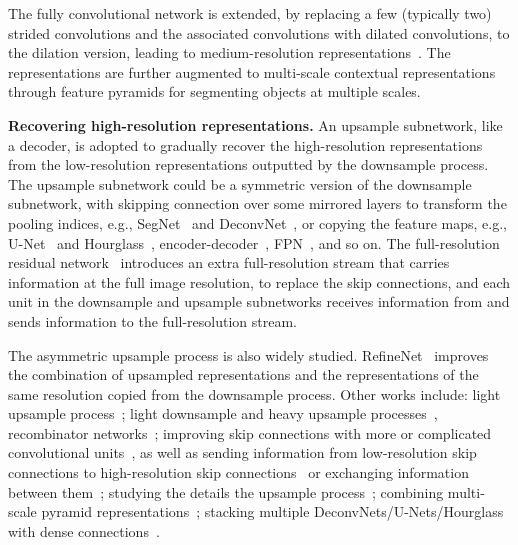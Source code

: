 \documentclass[10pt,twocolumn,letterpaper]{article}
\begin{document}
The fully convolutional network
is extended,
by replacing a few (typically two) strided convolutions
and the associated convolutions with dilated convolutions,
to the dilation version,
leading to medium-resolution representations~\cite{ZhaoSQWJ17,ChenPKMY18, YuKF17,ChenPKMY14, LiPYZDS18}.
The representations are further augmented
to multi-scale contextual representations~\cite{ZhaoSQWJ17,ChenPKMY18,ChenYWXY16} through feature pyramids
for segmenting objects at multiple scales.

\vspace{.1cm}
\noindent\textbf{Recovering high-resolution representations.}
An upsample subnetwork,
like a decoder,
is adopted
to gradually recover the high-resolution representations
from the low-resolution representations outputted by the downsample process.
The upsample subnetwork could be a symmetric version
of the downsample subnetwork,
with skipping connection over some mirrored layers
to transform the pooling indices,
e.g., SegNet~\cite{BadrinarayananK17} and DeconvNet~\cite{NohHH15},
or copying the feature maps, e.g., U-Net~\cite{RonebergerFB15} and Hourglass~\cite{NewellYD16, YangLZ17, BulatT17, DengTZZ17, BulatT17a},
encoder-decoder~\cite{PengFWM16},
FPN~\cite{LinDGHHB17}, and so on.
The full-resolution residual network~\cite{PohlenHML17}
introduces an extra full-resolution stream
that carries information at the full image resolution,
to replace the skip connections,
and each unit in the downsample and upsample subnetworks
receives information from and sends information to
the full-resolution stream.

The asymmetric upsample process is also widely studied.
RefineNet~\cite{LinMSR17} improves the combination
of upsampled representations and
the representations of the same resolution
copied from the downsample process.
Other works include:
light upsample process~\cite{BulatT16};
light downsample and heavy upsample processes~\cite{ValleBVB18},
recombinator networks~\cite{HonariYVP16};
improving skip connections with more or complicated convolutional units~\cite{PengZYLS17, ZhangZPXS18, IslamRBW17}, as well as sending information from low-resolution skip connections to high-resolution skip connections~\cite{ZhouSTL18}
or exchanging information between them~\cite{GuoDXZ18};
studying the details the upsample process~\cite{WojnaUGSCFF17};
combining multi-scale pyramid representations~\cite{ChenZPSA18, XiaoLZJS18};
stacking multiple DeconvNets/U-Nets/Hourglass~\cite{FuLWL17, Wu0YWC018}
with dense connections~\cite{TangPGWZM18}.
\end{document}
